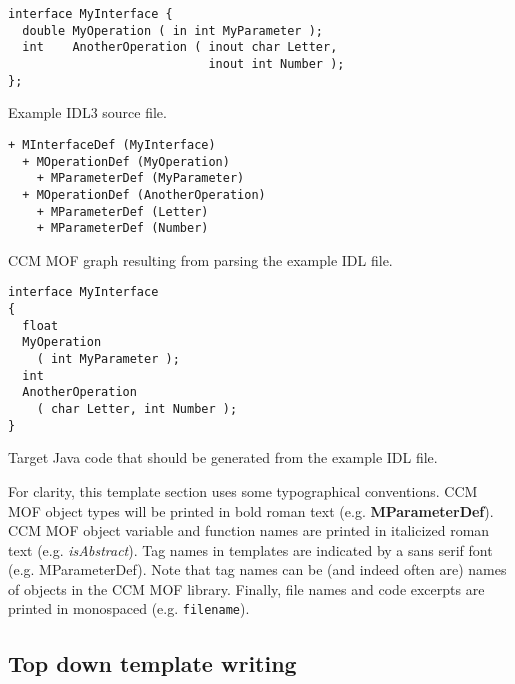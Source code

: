 \begin{Example}
\begin{minifbox}
\begin{verbatim}
interface MyInterface {
  double MyOperation ( in int MyParameter );
  int    AnotherOperation ( inout char Letter,
                            inout int Number );
};
\end{verbatim}
\caption{Example IDL3 source file.}
\label{example:component-idl3-code}
\end{minifbox}
\end{Example}

\begin{Example}
\begin{minifbox}
\begin{verbatim}
+ MInterfaceDef (MyInterface)
  + MOperationDef (MyOperation)
    + MParameterDef (MyParameter)
  + MOperationDef (AnotherOperation)
    + MParameterDef (Letter)
    + MParameterDef (Number)
\end{verbatim}
\end{minifbox}
\caption{CCM MOF graph resulting from parsing the example IDL file.}
\label{example:component-parse-tree}
\end{Example}

\begin{Example}
\begin{minifbox}
\begin{verbatim}
interface MyInterface
{
  float
  MyOperation
    ( int MyParameter );
  int
  AnotherOperation
    ( char Letter, int Number );
}
\end{verbatim}
\caption{Target Java code that should be generated from the example IDL file.}
\label{example:component-generated-java}
\end{minifbox}
\end{Example}

For clarity, this template section uses some typographical conventions. CCM MOF
object types will be printed in bold roman text (e.g. {\bf MParameterDef}). CCM
MOF object variable and function names are printed in italicized roman text
(e.g. {\it isAbstract\/}). Tag names in templates are indicated by a sans serif
font (e.g. {\sf MParameterDef}). Note that tag names can be (and indeed often
are) names of objects in the CCM MOF library. Finally, file names and code
excerpts are printed in monospaced (e.g. {\tt filename}).

\subsection{Top down template writing}

